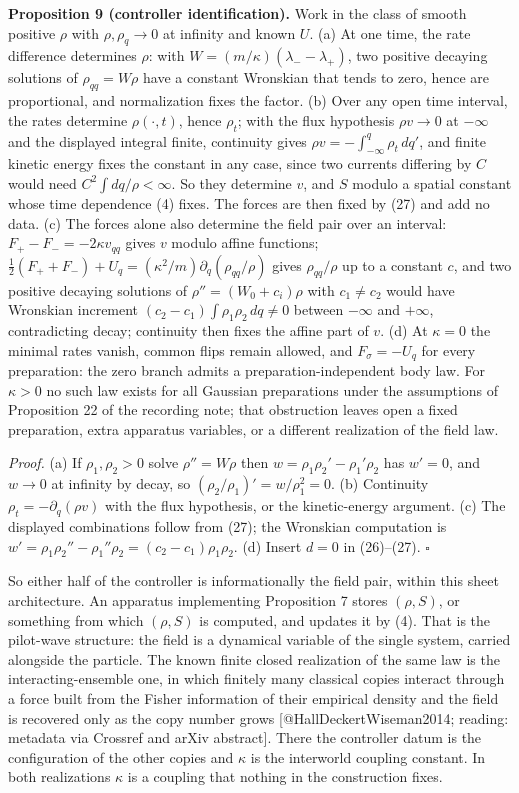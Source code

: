\documentclass[11pt,a4paper]{article}
\begin{document}
\textbf{Proposition 9 (controller identification).} Work in the class of
smooth positive \(\rho\) with \(\rho,\rho_q\to0\) at infinity and known
\(U\). (a) At one time, the rate difference determines \(\rho\): with
\(W=(m/\kappa)(\lambda_--\lambda_+)\), two positive decaying solutions
of \(\rho_{qq}=W\rho\) have a constant Wronskian that tends to zero,
hence are proportional, and normalization fixes the factor. (b) Over any
open time interval, the rates determine \(\rho(\cdot,t)\), hence
\(\rho_t\); with the flux hypothesis \(\rho v\to0\) at \(-\infty\) and
the displayed integral finite, continuity gives
\(\rho v=-\int_{-\infty}^q\rho_t\,dq'\), and finite kinetic energy fixes
the constant in any case, since two currents differing by \(C\) would
need \(C^2\int dq/\rho<\infty\). So they determine \(v\), and \(S\)
modulo a spatial constant whose time dependence (4) fixes. The forces
are then fixed by (27) and add no data. (c) The forces alone also
determine the field pair over an interval: \(F_+-F_-=-2\kappa v_{qq}\)
gives \(v\) modulo affine functions;
\(\tfrac12(F_++F_-)+U_q=(\kappa^2/m)\partial_q(\rho_{qq}/\rho)\) gives
\(\rho_{qq}/\rho\) up to a constant \(c\), and two positive decaying
solutions of \(\rho''=(W_0+c_i)\rho\) with \(c_1\neq c_2\) would have
Wronskian increment \((c_2-c_1)\int\rho_1\rho_2\,dq\neq0\) between
\(-\infty\) and \(+\infty\), contradicting decay; continuity then fixes
the affine part of \(v\). (d) At \(\kappa=0\) the minimal rates vanish,
common flips remain allowed, and \(F_\sigma=-U_q\) for every
preparation: the zero branch admits a preparation-independent body law.
For \(\kappa>0\) no such law exists for all Gaussian preparations under
the assumptions of Proposition 22 of the recording note; that
obstruction leaves open a fixed preparation, extra apparatus variables,
or a different realization of the field law.

\emph{Proof.} (a) If \(\rho_1,\rho_2>0\) solve \(\rho''=W\rho\) then
\(w=\rho_1\rho_2'-\rho_1'\rho_2\) has \(w'=0\), and \(w\to0\) at
infinity by decay, so \((\rho_2/\rho_1)'=w/\rho_1^2=0\). (b) Continuity
\(\rho_t=-\partial_q(\rho v)\) with the flux hypothesis, or the
kinetic-energy argument. (c) The displayed combinations follow from
(27); the Wronskian computation is
\(w'=\rho_1\rho_2''-\rho_1''\rho_2=(c_2-c_1)\rho_1\rho_2\). (d) Insert
\(d=0\) in (26)--(27). \(\square\)

So either half of the controller is informationally the field pair,
within this sheet architecture. An apparatus implementing Proposition 7
stores \((\rho,S)\), or something from which \((\rho,S)\) is computed,
and updates it by (4). That is the pilot-wave structure: the field is a
dynamical variable of the single system, carried alongside the particle.
The known finite closed realization of the same law is the
interacting-ensemble one, in which finitely many classical copies
interact through a force built from the Fisher information of their
empirical density and the field is recovered only as the copy number
grows {[}@HallDeckertWiseman2014; reading: metadata via Crossref and
arXiv abstract{]}. There the controller datum is the configuration of
the other copies and \(\kappa\) is the interworld coupling constant. In
both realizations \(\kappa\) is a coupling that nothing in the
construction fixes.
\end{document}
